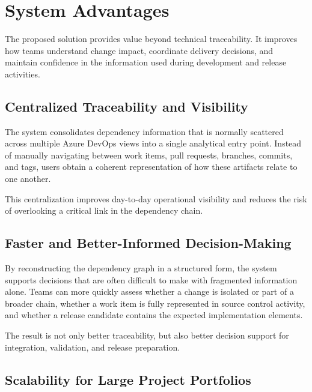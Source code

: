 
\section{System Advantages}

The proposed solution provides value beyond technical traceability. It improves
how teams understand change impact, coordinate delivery decisions, and maintain
confidence in the information used during development and release activities.

\subsection{Centralized Traceability and Visibility}

The system consolidates dependency information that is normally scattered across
multiple Azure DevOps views into a single analytical entry point. Instead of
manually navigating between work items, pull requests, branches, commits, and
tags, users obtain a coherent representation of how these artifacts relate to
one another.

This centralization improves day-to-day operational visibility and reduces the
risk of overlooking a critical link in the dependency chain.

\subsection{Faster and Better-Informed Decision-Making}

By reconstructing the dependency graph in a structured form, the system supports
decisions that are often difficult to make with fragmented information alone.
Teams can more quickly assess whether a change is isolated or part of a broader
chain, whether a work item is fully represented in source control activity, and
whether a release candidate contains the expected implementation elements.

The result is not only better traceability, but also better decision support for
integration, validation, and release preparation.

\subsection{Scalability for Large Project Portfolios}

